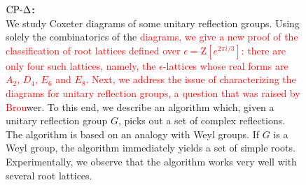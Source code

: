\begin{figure}[!htbp]
\begin{mdframed}
\begin{minipage}[t]{\textwidth}
 \end{minipage}
    \vspace{10pt}
    \begin{minipage}[t]{\textwidth}
        \textbf{$\text{CP-}\Delta$:} \\
We study Coxeter diagrams of some unitary reflection groups. Using solely the combinatorics of the \textcolor{red}{diagrams, we give a new proof of the classification of root lattices defined over $\epsilon = \mathrm{Z}[e^{2 \pi i/3}]$: there are only four such lattices, namely, the $\epsilon$-lattices whose real forms are $A_2$, $D_4$, $E_6$ and $E_8$. Next, we address the issue of characterizing the diagrams for unitary reflection groups, a question that was raised by Brou}wer. To this end, we describe an algorithm which, given a unitary reflection group $G$, picks out a set of complex reflections. The algorithm is based on an analogy with Weyl groups. If $G$ is a Weyl group, the algorithm immediately yields a set of simple roots. Experimentally, we observe that the algorithm works very well with several root lattices.


\end{minipage}
\end{mdframed}
\end{figure}
